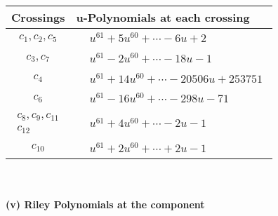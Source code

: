 \documentclass[1p]{elsarticle_modified}
\theoremstyle{definition}
\begin{document}
\begin{tabular}{m{50pt}|m{274pt}}
Crossings & \hspace{64pt}u-Polynomials at each crossing \\
\hline $$\begin{aligned}c_{1},c_{2},c_{5}\end{aligned}$$&$\begin{aligned}
&u^{61}+5 u^{60}+\cdots-6 u+2
\end{aligned}$\\
\hline $$\begin{aligned}c_{3},c_{7}\end{aligned}$$&$\begin{aligned}
&u^{61}-2 u^{60}+\cdots-18 u-1
\end{aligned}$\\
\hline $$\begin{aligned}c_{4}\end{aligned}$$&$\begin{aligned}
&u^{61}+14 u^{60}+\cdots-20506 u+253751
\end{aligned}$\\
\hline $$\begin{aligned}c_{6}\end{aligned}$$&$\begin{aligned}
&u^{61}-16 u^{60}+\cdots-298 u-71
\end{aligned}$\\
\hline $$\begin{aligned}c_{8},c_{9},c_{11}\\c_{12}\end{aligned}$$&$\begin{aligned}
&u^{61}+4 u^{60}+\cdots-2 u-1
\end{aligned}$\\
\hline $$\begin{aligned}c_{10}\end{aligned}$$&$\begin{aligned}
&u^{61}+2 u^{60}+\cdots+2 u-1
\end{aligned}$\\
\hline
\end{tabular}\\~\\
\newpage\renewcommand{\arraystretch}{1}
\flushleft \textbf{(v) Riley Polynomials at the component}\newline \\
\end{document}
